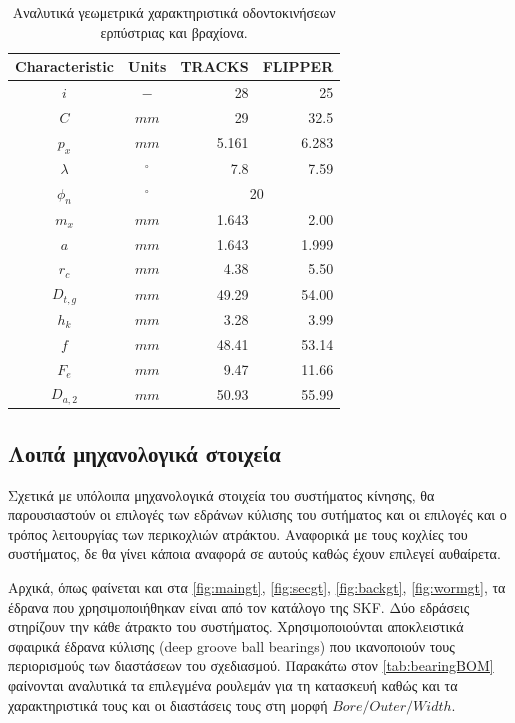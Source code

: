 \begin{table}[H]
    \centering
\begin{tabular}{|c|c|r|r|}
\hline
\rowcolor{YellowGreen}
Characteristic & Units & TRACKS & FLIPPER \\
\hline
$i$ & $-$ &  28 & 25\\ 
\hline
$C$ & $mm$ &  29 & 32.5\\ 
\hline
$p_x$ & $mm$ & 5.161 & 6.283\\ 
\hline
$\lambda$ & $^\circ$ &  7.8 & 7.59\\ 
\hline
$\phi_n$ & $^\circ$ &  \multicolumn{2}{c|}{20}\\ 
\hline
$m_x$ & $mm$ &  1.643 & 2.00\\ 
\hline
$a$ & $mm$ &  1.643 & 1.999\\ 
\hline
$r_c$ & $mm$ &  4.38 & 5.50\\ 
\hline
$D_{t,g}$ & $mm$ &  49.29 & 54.00\\ 
\hline
$h_k$ & $mm$ &  3.28 & 3.99\\ 
\hline
$f$ & $mm$ &  48.41 & 53.14\\ 
\hline
$F_e$ & $mm$ &  9.47 & 11.66\\ 
\hline
$D_{a,2}$ & $mm$ &  50.93 & 55.99\\ 
\hline
\end{tabular}



    \caption{Αναλυτικά γεωμετρικά χαρακτηριστικά οδοντοκινήσεων ερπύστριας και βραχίονα.}
    \label{tab:gearAnal}
\end{table}






\subsection{Λοιπά μηχανολογικά στοιχεία}


Σχετικά με υπόλοιπα μηχανολογικά στοιχεία του συστήματος κίνησης, θα παρουσιαστούν οι επιλογές των εδράνων κύλισης του συτήματος και οι επιλογές και ο τρόπος λειτουργίας των περικοχλιών ατράκτου. Αναφορικά με τους κοχλίες του συστήματος, δε θα γίνει κάποια αναφορά σε αυτούς καθώς έχουν επιλεγεί αυθαίρετα. 
\par Αρχικά, όπως φαίνεται και στα \ref{fig:maingt}, \ref{fig:secgt}, \ref{fig:backgt}, \ref{fig:wormgt}, τα έδρανα που χρησιμοποιήθηκαν είναι από τον κατάλογο της SKF. Δύο εδράσεις στηρίζουν την κάθε άτρακτο του συστήματος. Χρησιμοποιούνται αποκλειστικά σφαιρικά έδρανα κύλισης (deep groove ball bearings) που ικανοποιούν τους περιορισμούς των διαστάσεων του σχεδιασμού. Παρακάτω στον \ref{tab:bearingBOM} φαίνονται αναλυτικά τα επιλεγμένα ρουλεμάν για τη κατασκευή καθώς και τα χαρακτηριστικά τους και οι διαστάσεις τους στη μορφή $Bore/Outer/Width$.


